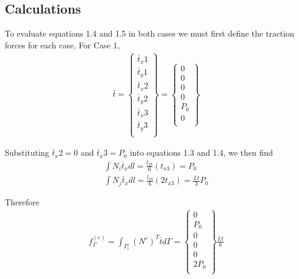 \documentclass[a4paper]{memoir}
\begin{document}
\subsection{Calculations}
To evaluate equations 1.4 and 1.5 in both cases we must first define the traction forces for each case,
For Case 1,
\begin{align*}
	& \bar{t} = 
	\begin{Bmatrix}
		\bar{t}_x1 \\
		\bar{t}_y1 \\
		\bar{t}_x2 \\
		\bar{t}_y2 \\
		\bar{t}_x3 \\
		\bar{t}_y3 \\
	\end{Bmatrix}
	= 
	\begin{Bmatrix}
		0 \\
		0 \\
		0 \\
		0 \\
		P_0 \\
		0 \\
	\end{Bmatrix}
\end{align*}

Substituting $\bar{t}_x2 = 0$ and $\bar{t}_x3 = P_0$ into equations 1.3 and 1.4, we then find
\begin{align} 
	& \int N_i\bar{t}_x dl = \frac{l_{23}}{6}(t_{x3}) = P_0\\
	& \int N_j\bar{t}_x dl = \frac{l_{23}}{6}(2t_{x3}) = \frac{Lt}{3}P_0
\end{align}

Therefore
\begin{align*}
& f_{\Gamma}^{(e)} = \int_{\Gamma^e_t} (N^{e})^{T} \bar{t} d\Gamma = 
	\begin{Bmatrix}
		0 \\
		P_0 \\
		0 \\
		0 \\
		0 \\
		2P_0 \\
	\end{Bmatrix} \frac{Lt}{6}
\end{align*}
\end{document}
